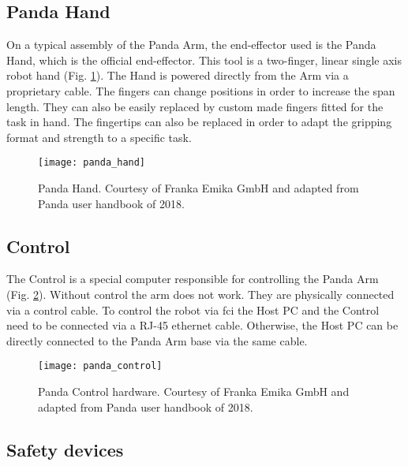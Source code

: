 
\subsection*{Panda Hand}
\label{subsec:robotic_system_physical_description_panda_hand}

On a typical assembly of the Panda Arm, the end-effector used is the Panda Hand, which is the official end-effector. This tool is a two-finger, linear single axis robot hand (Fig. \ref{fig:panda_hand}). The Hand is powered directly from the Arm via a proprietary cable. The fingers can change positions in order to increase the span length. They can also be easily replaced by custom made fingers fitted for the task in hand. The fingertips can also be replaced in order to adapt the gripping format and strength to a specific task.

\begin{figure}[htbp]
    \centering
	\texttt{[image: panda\_hand]}
	\caption{Panda Hand. Courtesy of Franka Emika GmbH and adapted from Panda user handbook of 2018.}
	\label{fig:panda_hand}
\end{figure}


\subsection*{Control}
\label{subsec:robotic_system_physical_description_control}

The Control is a special computer responsible for controlling the Panda Arm (Fig. \ref{fig:panda_control}). Without control the arm does not work. They are physically connected via a control cable. To control the robot via \gls{fci} the Host PC and the Control need to be connected via a RJ-45 ethernet cable. Otherwise, the Host PC can be directly connected to the Panda Arm base via the same cable.

\begin{figure}[htbp]
    \centering
	\texttt{[image: panda\_control]}
	\caption{Panda Control hardware. Courtesy of Franka Emika GmbH and adapted from Panda user handbook of 2018.}
	\label{fig:panda_control}
\end{figure}


\subsection*{Safety devices}
\label{subsec:robotic_system_physical_description_safety_devices}

